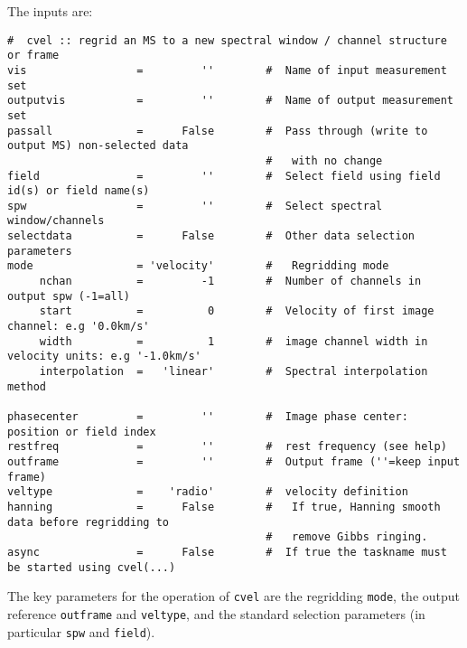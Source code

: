 The inputs are:
\small
\begin{verbatim}
#  cvel :: regrid an MS to a new spectral window / channel structure or frame
vis                 =         ''        #  Name of input measurement set
outputvis           =         ''        #  Name of output measurement set
passall             =      False        #  Pass through (write to output MS) non-selected data
                                        #   with no change
field               =         ''        #  Select field using field id(s) or field name(s)
spw                 =         ''        #  Select spectral window/channels
selectdata          =      False        #  Other data selection parameters
mode                = 'velocity'        #   Regridding mode
     nchan          =         -1        #  Number of channels in output spw (-1=all)
     start          =          0        #  Velocity of first image channel: e.g '0.0km/s'
     width          =          1        #  image channel width in velocity units: e.g '-1.0km/s'
     interpolation  =   'linear'        #  Spectral interpolation method

phasecenter         =         ''        #  Image phase center: position or field index
restfreq            =         ''        #  rest frequency (see help)
outframe            =         ''        #  Output frame (''=keep input frame)
veltype             =    'radio'        #  velocity definition
hanning             =      False        #   If true, Hanning smooth data before regridding to
                                        #   remove Gibbs ringing.
async               =      False        #  If true the taskname must be started using cvel(...)

\end{verbatim}
\normalsize

The key parameters for the operation of {\tt cvel} are the regridding
{\tt mode}, the output reference {\tt outframe} and {\tt veltype}, and
the standard selection parameters (in particular {\tt spw} and {\tt field}).

